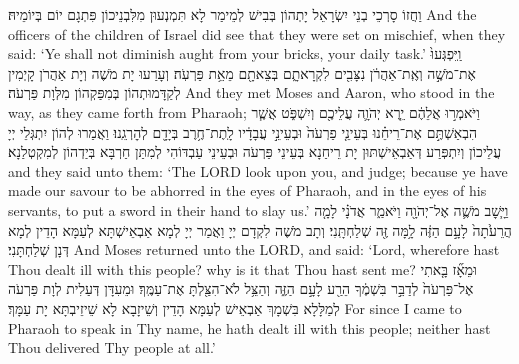 {{}
{וַחֲזוֹ סָרְכֵי בְנֵי יִשְׂרָאֵל יָתְהוֹן בְּבִישׁ לְמֵימַר לָא תִּמְנְעוּן מִלִּבְנֵיכוֹן פִּתְגָם יוֹם בְּיוֹמֵיהּ׃}
{And the officers of the children of Israel did see that they were set on mischief, when they said: ‘Ye shall not diminish aught from your bricks, your daily task.’}{}
{וַֽיִּפְגְּעוּ֙ אֶת־מֹשֶׁ֣ה וְאֶֽת־אַהֲרֹ֔ן נִצָּבִ֖ים לִקְרָאתָ֑ם בְּצֵאתָ֖ם מֵאֵ֥ת פַּרְעֹֽה׃
}
{וְעָרַעוּ יָת מֹשֶׁה וְיָת אַהֲרֹן קָיְמִין לְקַדָּמוּתְהוֹן בְּמִפַּקְהוֹן מִלְּוָת פַּרְעֹה׃}
{And they met Moses and Aaron, who stood in the way, as they came forth from Pharaoh;}{}
{וַיֹּאמְר֣וּ אֲלֵהֶ֔ם יֵ֧רֶא יְהֹוָ֛ה עֲלֵיכֶ֖ם וְיִשְׁפֹּ֑ט אֲשֶׁ֧ר הִבְאַשְׁתֶּ֣ם אֶת־רֵיחֵ֗נוּ בְּעֵינֵ֤י פַרְעֹה֙ וּבְעֵינֵ֣י עֲבָדָ֔יו לָֽתֶת־חֶ֥רֶב בְּיָדָ֖ם לְהׇרְגֵֽנוּ׃}
{וַאֲמַרוּ לְהוֹן יִתְגְּלֵי יְיָ עֲלֵיכוֹן וְיִתְפְּרַע דְּאַבְאֵישְׁתּוּן יָת רֵיחַנָא בְּעֵינֵי פַּרְעֹה וּבְעֵינֵי עַבְדּוֹהִי לְמִתַּן חַרְבָּא בְּיַדְהוֹן לְמִקְטְלַנָא׃}
{and they said unto them: ‘The LORD look upon you, and judge; because ye have made our savour to be abhorred in the eyes of Pharaoh, and in the eyes of his servants, to put a sword in their hand to slay us.’}{}
{וַיָּ֧שׇׁב מֹשֶׁ֛ה אֶל־יְהֹוָ֖ה וַיֹּאמַ֑ר אֲדֹנָ֗י לָמָ֤ה הֲרֵעֹ֙תָה֙ לָעָ֣ם הַזֶּ֔ה לָ֥מָּה זֶּ֖ה שְׁלַחְתָּֽנִי׃
}
{וְתָב מֹשֶׁה לִקְדָם יְיָ וַאֲמַר יְיָ לְמָא אַבְאֵישְׁתָּא לְעַמָּא הָדֵין לְמָא דְּנָן שְׁלַחְתָּנִי׃}
{And Moses returned unto the LORD, and said: ‘Lord, wherefore hast Thou dealt ill with this people? why is it that Thou hast sent me?}{}
{וּמֵאָ֞ז בָּ֤אתִי אֶל־פַּרְעֹה֙ לְדַבֵּ֣ר בִּשְׁמֶ֔ךָ הֵרַ֖ע לָעָ֣ם הַזֶּ֑ה וְהַצֵּ֥ל לֹא־הִצַּ֖לְתָּ אֶת־עַמֶּֽךָ׃
}
{וּמֵעִדָּן דְּעַלִית לְוָת פַּרְעֹה לְמַלָּלָא בִּשְׁמָךְ אַבְאֵישׁ לְעַמָּא הָדֵין וְשֵׁיזָבָא לָא שֵׁיזֵיבְתָּא יָת עַמָּךְ׃}
{For since I came to Pharaoh to speak in Thy name, he hath dealt ill with this people; neither hast Thou delivered Thy people at all.’}{}
\newperek
{}%
}
